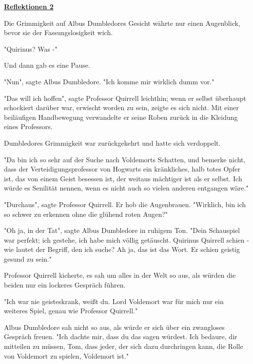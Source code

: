 

\hypertarget{reflektionen-2}{%

\textbf{\uline{Reflektionen 2}}

Die Grimmigkeit auf Albus Dumbledores Gesicht währte nur einen Augenblick, bevor sie der Fassungslosigkeit wich.

"Quirinus? Was -"

Und dann gab es eine Pause.

"Nun", sagte Albus Dumbledore. "Ich komme mir wirklich dumm vor."

"Das will ich hoffen", sagte Professor Quirrell leichthin; wenn er selbst überhaupt schockiert darüber war, erwischt worden zu sein, zeigte es sich nicht. Mit einer beiläufigen Handbewegung verwandelte er seine Roben zurück in die Kleidung eines Professors.

Dumbledores Grimmigkeit war zurückgekehrt und hatte sich verdoppelt.

"Da bin ich so sehr auf der Suche nach Voldemorts Schatten, und bemerke nicht, dass der Verteidigungsprofessor von Hogwarts ein kränkliches, halb totes Opfer ist, das von einem Geist besessen ist, der weitaus mächtiger ist als er selbst. Ich würde es Senilität nennen, wenn es nicht auch so vielen anderen entgangen wäre."

"Durchaus", sagte Professor Quirrell. Er hob die Augenbrauen. "Wirklich, bin ich so schwer zu erkennen ohne die glühend roten Augen?"

"Oh ja, in der Tat", sagte Albus Dumbledore in ruhigem Ton. "Dein Schauspiel war perfekt; ich gestehe, ich habe mich völlig getäuscht. Quirinus Quirrell schien - wie lautet der Begriff, den ich suche? Ah ja, das ist das Wort. Er schien geistig gesund zu sein."

Professor Quirrell kicherte, es sah um alles in der Welt so aus, als würden die beiden nur ein lockeres Gespräch führen.

"Ich war nie geisteskrank, weißt du. Lord Voldemort war für mich nur ein weiteres Spiel, genau wie Professor Quirrell."

Albus Dumbledore sah nicht so aus, als würde er sich über ein zwangloses Gespräch freuen. "Ich dachte mir, dass du das sagen würdest. Ich bedaure, dir mitteilen zu müssen, Tom, dass jeder, der sich dazu durchringen kann, die Rolle von Voldemort zu spielen, Voldemort ist."

}
